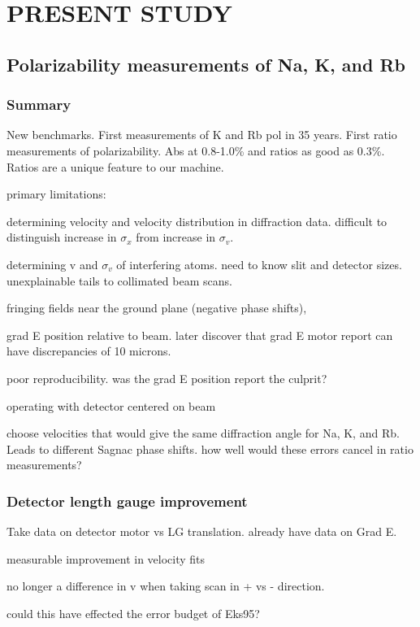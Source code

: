 \chapter{PRESENT STUDY}

\section{Polarizability measurements of Na, K, and Rb}
\subsection{Summary}
New benchmarks. First measurements of K and Rb pol in 35 years. First ratio measurements of polarizability. Abs at  0.8-1.0\% and ratios as good as 0.3\%. Ratios are a unique feature to our machine.


primary limitations: 

determining velocity and velocity distribution in diffraction data. difficult to distinguish increase in $\sigma_x$ from increase in $\sigma_v$.

determining v and $\sigma_v$ of interfering atoms. need to know slit and detector sizes. unexplainable tails to collimated beam scans. 

fringing fields near the ground plane (negative phase shifts), 

grad E position relative to beam. later discover that grad E motor report can have discrepancies of 10 microns. 

poor reproducibility. was the grad E position report the culprit?

operating with detector centered on beam

choose velocities that would give the same diffraction angle for Na, K, and Rb. Leads to different Sagnac phase shifts. how well would these errors cancel in ratio measurements?

\subsection{Detector length gauge improvement}

Take data on detector motor vs LG translation. already have data on Grad E.

measurable improvement in velocity fits

no longer a difference in v when taking scan in + vs - direction.

could this have effected the error budget of Eks95?

